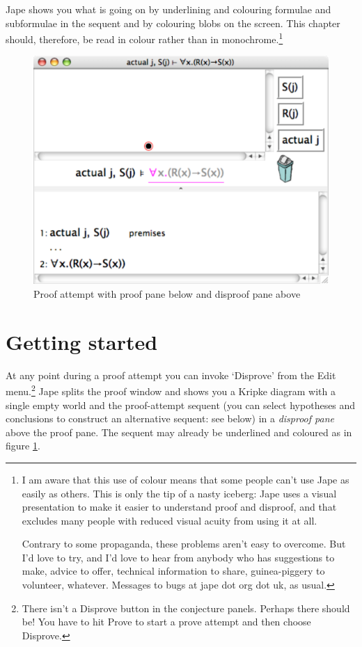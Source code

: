 \documentclass[11pt]{book}
\newcommand{\figref}[1]{figure \ref{fig:#1}}
\begin{document}
Jape shows you what is going on by underlining and colouring formulae and subformulae in the sequent and by colouring blobs on the screen. This chapter should, therefore, be read in colour rather than in monochrome.\footnote{I am aware that this use of colour means that some people can't use Jape as easily as others. This is only the tip of a nasty iceberg: Jape uses a visual presentation to make it easier to understand proof and disproof, and that excludes many people with reduced visual acuity from using it at all.

Contrary to some propaganda, these problems aren't easy to overcome. But I'd love to try, and I'd love to hear from anybody who has suggestions to make, advice to offer, technical information to share, guinea-piggery to volunteer, whatever. Messages to bugs at jape dot org dot uk, as usual.}

\begin{figure}
\centering
\includegraphics[scale=0.5]{pics/disproofpane}
\caption{Proof attempt with proof pane below and disproof pane above}
\label{fig:disproofpane}
\end{figure}

\section{Getting started}

At any point during a proof attempt you can invoke `Disprove' from the Edit menu.\footnote{There isn't a Disprove button in the conjecture panels. Perhaps there should be! You have to hit Prove to start a prove attempt and then choose Disprove.} Jape splits the proof window and shows you a Kripke diagram with a single empty world and the proof-attempt sequent (you can select hypotheses and conclusions to construct an alternative sequent: see below) in a \emph{disproof pane} above the proof pane. The sequent may already be underlined and coloured as in \figref{disproofpane}.
\end{document}
